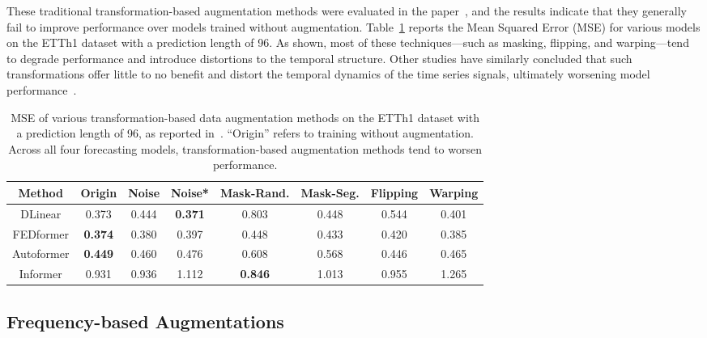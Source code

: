 These traditional transformation-based augmentation methods were evaluated in the paper~\cite{chen2023fraugfrequencydomainaugmentation}, and the results indicate that they generally fail to improve performance over models trained without augmentation. Table~\ref{tab:Trad} reports the Mean Squared Error (MSE) for various models on the ETTh1 dataset with a prediction length of 96. As shown, most of these techniques—such as masking, flipping, and warping—tend to degrade performance and introduce distortions to the temporal structure. Other studies have similarly concluded that such transformations offer little to no benefit and distort the temporal dynamics of the time series signals, ultimately worsening model performance~\cite{Wen_2021, zhang2023diversecoherentaugmentationtimeseries, zhao2024dominantshufflesimplepowerful}.


\begin{table}[h]
\centering

\begin{adjustbox}{max width=\textwidth}

\begin{tabular}{c|c|c|c|c|c|c|c}
\toprule
Method & Origin & Noise & Noise* & Mask-Rand. & Mask-Seg. &Flipping &Warping\\ \midrule
DLinear & 0.373 & 0.444 & \textbf{0.371} & 0.803 &0.448 & 0.544 &0.401  \\
FEDformer & \textbf{0.374} & 0.380 & 0.397 & 0.448 &0.433 & 0.420 &0.385  \\
Autoformer & \textbf{0.449} & 0.460 & 0.476& 0.608 & 0.568  & 0.446 &0.465  \\
Informer & 0.931 & 0.936 & 1.112 & \textbf{0.846} & 1.013 & 0.955 &1.265 \\\bottomrule
\end{tabular}
\end{adjustbox}
\vspace{-0.1cm}
\caption{MSE of various transformation-based data augmentation methods on the ETTh1 dataset with a prediction length of 96, as reported in~\cite{chen2023fraugfrequencydomainaugmentation}. “Origin” refers to training without augmentation. Across all four forecasting models, transformation-based augmentation methods tend to worsen performance.}
\label{tab:Trad}
\vspace{-0.3cm}
\end{table}



\subsection{Frequency-based Augmentations}


